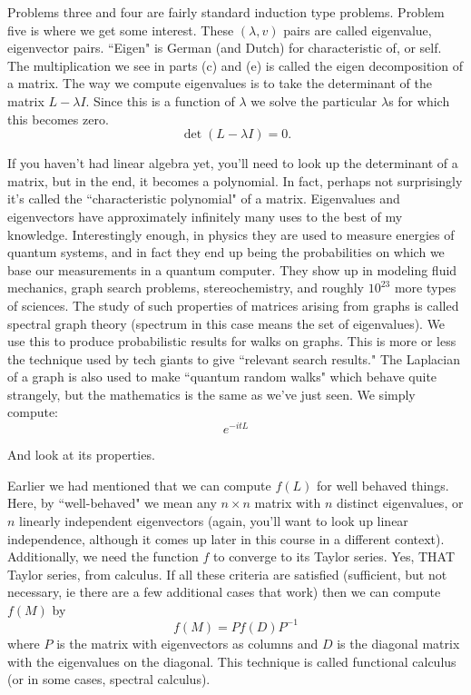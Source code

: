 \documentclass[16 pt]{amsart}
\theoremstyle{definition}
\theoremstyle{remark}
\numberwithin{equation}{subsection}
\begin{document}
Problems three and four are fairly standard induction type problems.  Problem five is where we get some interest.  These $(\lambda, v)$ pairs are called eigenvalue, eigenvector pairs.  ``Eigen" is German (and Dutch) for characteristic of, or self.  The multiplication we see in parts (c) and (e) is called the eigen decomposition of a matrix.  The way we compute eigenvalues is to take the determinant of the matrix $L-\lambda I$.  Since this is a function of $\lambda$ we solve the particular $\lambda$s for which this becomes zero.
\[
\det(L-\lambda I) = 0.
\]

If you haven't had linear algebra yet, you'll need to look up the determinant of a matrix, but in the end, it becomes a polynomial.  In fact, perhaps not surprisingly it's called the ``characteristic polynomial" of a matrix.  Eigenvalues and eigenvectors have approximately infinitely many uses to the best of my knowledge.  Interestingly enough, in physics they are used to measure energies of quantum systems, and in fact they end up being the probabilities on which we base our measurements in a quantum computer.  They show up in modeling fluid mechanics, graph search problems, stereochemistry, and roughly $10^{23}$ more types of sciences.  The study of such properties of matrices arising from graphs is called spectral graph theory (spectrum in this case means the set of eigenvalues).  We use this to produce probabilistic results for walks on graphs.  This is more or less the technique used by tech giants to give ``relevant search results."  The Laplacian of a graph is also used to make ``quantum random walks" which behave quite strangely, but the mathematics is the same as we've just seen.  We simply compute:
\[
e^{-itL}
\]

And look at its properties.\\

\par Earlier we had mentioned that we can compute $f(L)$ for well behaved things.  Here, by ``well-behaved" we mean any $n\times n$ matrix with $n$ distinct eigenvalues, or $n$ linearly independent eigenvectors (again, you'll want to look up linear independence, although it comes up later in this course in a different context).  Additionally, we need the function $f$ to converge to its Taylor series.  Yes, THAT Taylor series, from calculus.  If all these criteria are satisfied (sufficient, but not necessary, ie there are a few additional cases that work) then we can compute $f(M)$ by
\[
f(M) = Pf(D)P^{-1}
\]
where $P$ is the matrix with eigenvectors as columns and $D$ is the diagonal matrix with the eigenvalues on the diagonal.  This technique is called functional calculus (or in some cases, spectral calculus).
\end{document}
